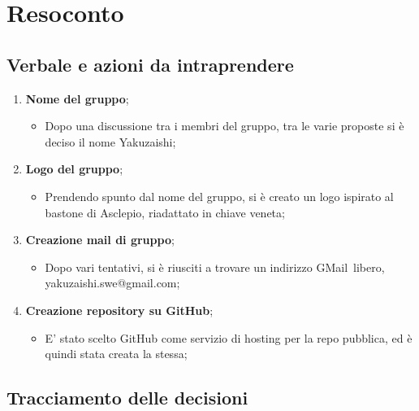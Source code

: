 \section{Resoconto}
\subsection{Verbale e azioni da intraprendere}

\begin{enumerate}
	\item \textbf{Nome del gruppo};
	\begin{itemize}
		\item Dopo una discussione tra i membri del gruppo, tra le varie proposte si è deciso il nome Yakuzaishi;
	\end{itemize}
	\item \textbf{Logo del gruppo};
	\begin{itemize}
		\item Prendendo spunto dal nome del gruppo, si è creato un logo ispirato al bastone di Asclepio, riadattato in chiave veneta;
	\end{itemize}
	\item \textbf{Creazione mail di gruppo};
	\begin{itemize}
		\item Dopo vari tentativi, si è riusciti a trovare un indirizzo GMail\glo\ libero, yakuzaishi.swe@gmail.com;
	\end{itemize}
	\item \textbf{Creazione repository su GitHub};
	\begin{itemize}
		\item E' stato scelto GitHub\glo{} come servizio di hosting per la repo pubblica, ed è quindi stata creata la stessa;
	\end{itemize}

\end{enumerate}

\pagebreak

\subsection{Tracciamento delle decisioni}

